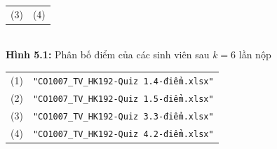 \documentclass[a4paper]{article}
\theoremstyle{definition}
\begin{document}
\begin{enumerate}[a)]
\begin{itemize}
\begin{center}
\begin{tabular}{c c}
                 (3) & (4)
            \end{tabular}\\
            \textbf{Hình 5.1:} Phân bố điểm của các sinh viên sau $k=6$ lần nộp\\
            \begin{tabular}{c c}
                 (1) & \texttt{"CO1007\_TV\_HK192-Quiz 1.4-điểm.xlsx"}\\
                 (2) & \texttt{"CO1007\_TV\_HK192-Quiz 1.5-điểm.xlsx"}\\
                 (3) & \texttt{"CO1007\_TV\_HK192-Quiz 3.3-điểm.xlsx"}\\
                 (4) & \texttt{"CO1007\_TV\_HK192-Quiz 4.2-điểm.xlsx"}
            \end{tabular}
        \end{center}
    \end{itemize}
    
    
    

\end{enumerate}
\end{document}
